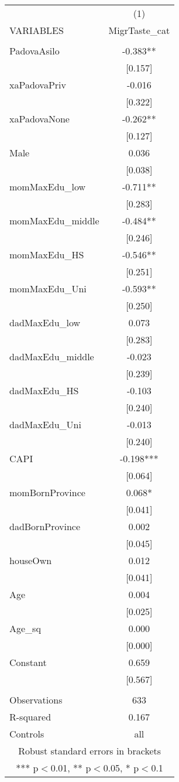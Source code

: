 \documentclass[]{article}
\begin{document}
\begin{tabular}{lc} \hline
 & (1) \\
VARIABLES & MigrTaste\_cat \\ \hline
 &  \\
PadovaAsilo & -0.383** \\
 & [0.157] \\
xaPadovaPriv & -0.016 \\
 & [0.322] \\
xaPadovaNone & -0.262** \\
 & [0.127] \\
Male & 0.036 \\
 & [0.038] \\
momMaxEdu\_low & -0.711** \\
 & [0.283] \\
momMaxEdu\_middle & -0.484** \\
 & [0.246] \\
momMaxEdu\_HS & -0.546** \\
 & [0.251] \\
momMaxEdu\_Uni & -0.593** \\
 & [0.250] \\
dadMaxEdu\_low & 0.073 \\
 & [0.283] \\
dadMaxEdu\_middle & -0.023 \\
 & [0.239] \\
dadMaxEdu\_HS & -0.103 \\
 & [0.240] \\
dadMaxEdu\_Uni & -0.013 \\
 & [0.240] \\
CAPI & -0.198*** \\
 & [0.064] \\
momBornProvince & 0.068* \\
 & [0.041] \\
dadBornProvince & 0.002 \\
 & [0.045] \\
houseOwn & 0.012 \\
 & [0.041] \\
Age & 0.004 \\
 & [0.025] \\
Age\_sq & 0.000 \\
 & [0.000] \\
Constant & 0.659 \\
 & [0.567] \\
 &  \\
Observations & 633 \\
R-squared & 0.167 \\
 Controls & all \\ \hline
\multicolumn{2}{c}{ Robust standard errors in brackets} \\
\multicolumn{2}{c}{ *** p$<$0.01, ** p$<$0.05, * p$<$0.1} \\
\end{tabular}
\end{document}
